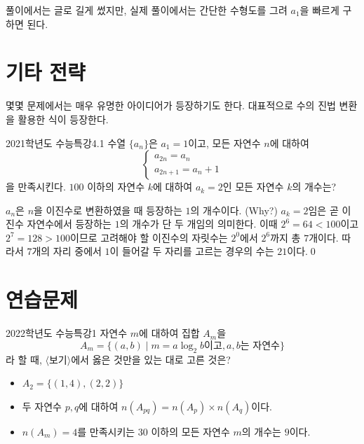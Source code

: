 \documentclass{article}
\begin{document}
\begin{remark}[참고]
	풀이에서는 글로 길게 썼지만, 실제 풀이에서는 간단한 수형도를 그려 $a_1$을 빠르게 구하면 된다.
\end{remark}

\section{기타 전략}
몇몇 문제에서는 매우 유명한 아이디어가 등장하기도 한다. 대표적으로 수의 진법 변환을 활용한 식이 등장한다.

\begin{exc}{2021학년도 수능특강}{4.1}
	수열 $\{a_n\}$은 $a_1=1$이고, 모든 자연수 $n$에 대하여
	\[
		\begin{cases}
			a_{2n}=a_n\\
			a_{2n+1}=a_n+1
		\end{cases}
	\]
	을 만족시킨다. $100$ 이하의 자연수 $k$에 대하여 $a_k=2$인 모든 자연수 $k$의 개수는?
\end{exc}

\begin{sol}
	$a_n$은 $n$을 이진수로 변환하였을 때 등장하는 $1$의 개수이다. (Why?) $a_k=2$임은 곧 이진수 자연수에서 등장하는 $1$의 개수가 단 두 개임의 의미한다. 이때 $2^6=64<100$이고 $2^7=128>100$이므로 고려해야 할 이진수의 자릿수는 $2^0$에서 $2^6$까지 총 $7$개이다. 따라서 $7$개의 자리 중에서 $1$이 들어갈 두 자리를 고르는 경우의 수는 $21$이다.\qed
\end{sol}

\newpage
\section*{연습문제}
\begin{prob}{2022학년도 수능특강}{1}
	자연수 $m$에 대하여 집합 $A_m$을
	\[
		A_m=\{(a,b)\mid m=a\log_2b\text{이고},a,b\text{는 자연수}\}
	\]
	라 할 때, $\langle$보기$\rangle$에서 옳은 것만을 있는 대로 고른 것은?
	\begin{hint}[보기]
		\begin{itemize}
			\item[ㄱ.] $A_2=\{(1,4),(2,2)\}$
			\item[ㄴ.] 두 자연수 $p,q$에 대하여 $n(A_{pq})=n(A_p)\times n(A_q)$이다.
			\item[ㄷ.] $n(A_m)=4$를 만족시키는 $30$ 이하의 모든 자연수 $m$의 개수는 $9$이다.
		\end{itemize}
	\end{hint}
\end{prob}
\end{document}
